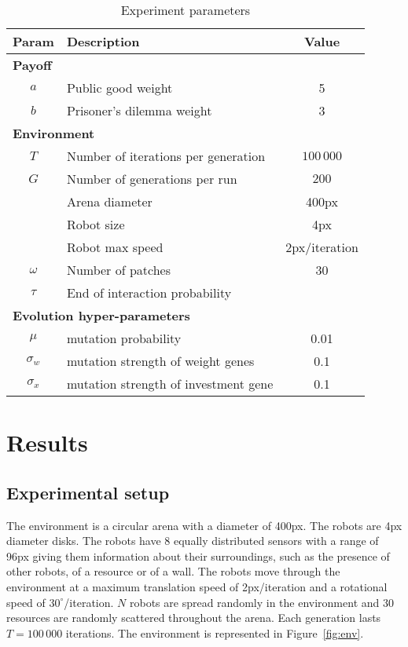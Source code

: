 \begin{table}
    \centering
    \begin{tabular}{clc}
        \hline
        \textbf{Param} & \textbf{Description}  & \textbf{Value} \\
        \hline
        \multicolumn{3}{l}{\textbf{Payoff}} \\
        $a$ & Public good weight & 5 \\
        $b$ & Prisoner's dilemma weight & 3 \\
        \multicolumn{3}{l}{\textbf{Environment}} \\
        $T$ & Number of iterations per generation & $100\,000$ \\
        $G$ & Number of generations per run & $200$ \\
        & Arena diameter & 400px \\
        & Robot size & 4px \\
        & Robot max speed & 2px/iteration \\
        $\omega$ & Number of patches & 30 \\
        $\tau$ & End of interaction probability & \\
        \multicolumn{3}{l}{\textbf{Evolution hyper-parameters}} \\
        $\mu$ & mutation probability & 0.01 \\
        $\sigma_w$ & mutation strength of weight genes & 0.1 \\
        $\sigma_x$ & mutation strength of investment gene& 0.1 \\
        \hline
    \end{tabular}
    \caption{Experiment parameters}
    \label{tab:env_params}
\end{table}

\section{Results}

\subsection{Experimental setup}

The environment is a circular arena with a diameter of 400px. The robots are 4px diameter disks. The robots have 8 equally distributed sensors with a range of 96px giving them information about their surroundings, such as the presence of other robots, of a resource or of a wall. The robots move through the environment at a maximum translation speed of 2px/iteration and a rotational speed of $30^\circ$/iteration. $N$ robots are spread randomly in the environment and 30 resources are randomly scattered throughout the arena. Each generation lasts $T = 100\,000$ iterations. The environment is represented in Figure~\ref{fig:env}.

